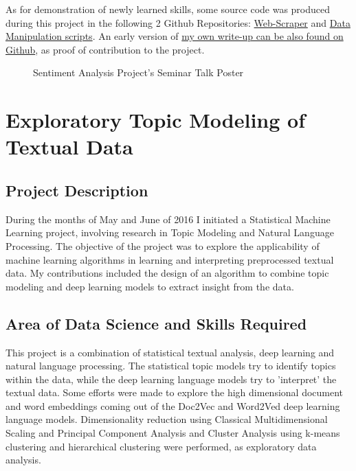 \documentclass[12pt]{article} %
\begin{document}
As for demonstration of newly learned skills, some source code was produced during this project in the following 2 Github Repositories:
\href{https://github.com/norberte/DataCollector}{Web-Scraper} and \href{https://github.com/norberte/Data_Manipulation_scripts}{Data Manipulation scripts}. An early version of \href{https://github.com/norberte/DataCollector/blob/master/docs/Sentiment\%20Analysis\%20Project\%20Write-Up.pdf}{my own write-up can be also found on Github}, as proof of contribution to the project.

\begin{figure}[H]
\caption{Sentiment Analysis Project’s Seminar Talk Poster}
\label{fig:sentAnalysisPoster}
\end{figure}

\section{Exploratory Topic Modeling of Textual Data} %
\subsection{Project Description} %
During the months of May and June of 2016 I initiated a Statistical Machine Learning project, involving research in Topic Modeling and Natural Language Processing. The objective of the project was to explore the applicability of machine learning algorithms in learning and interpreting preprocessed textual data. My contributions included the design of an algorithm to combine topic modeling and deep learning models to extract insight from the data.

\subsection{Area of Data Science and Skills Required} %
This project is a combination of statistical textual analysis, deep learning and natural language processing. The statistical topic models try to identify topics within the data, while the deep learning language models try to 'interpret' the textual data. Some efforts were made to explore the high dimensional document and word embeddings coming out of the Doc2Vec and Word2Ved deep learning language models. Dimensionality reduction using Classical Multidimensional Scaling and Principal Component Analysis and Cluster Analysis using k-means clustering and hierarchical clustering were performed, as exploratory data analysis. 
\end{document}
